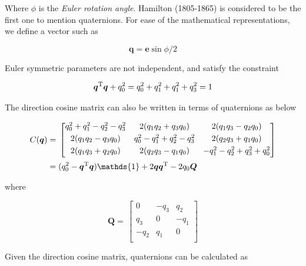 Where $\phi$ is the \emph{Euler rotation angle}. 
Hamilton (1805-1865) is considered to be the first one to mention quaternions. 
For ease of the mathematical representations, we define a vector such as

\begin{equation}
\label{eqn:quat3}
\bm{q} = \bm{e}\sin{\phi/2}
\end{equation}

Euler symmetric parameters are not independent, and satisfy the constraint

\begin{equation}
\label{eqn:quatNormConstraint}
\bm{q}^{\rm T} \bm{q} + q_0^2 = q_0^2 + q_1^2 +q_1^2 +q_3^2 = 1
\end{equation}

The direction cosine matrix can also be written in terms of quaternions as below

\begin{align}\label{eqn:Cquat}
\begin{split}
C(\bm{q})
 & =\,
\begin{bmatrix}
q_0^2 + q_1^2 - q_2^2 - q_3^2 & 2(q_1 q_2 + q_3 q_0) & 2(q_1 q_3 - q_2 q_0)\\[0.3em]
2(q_1 q_2 - q_3 q_0) & q_0^2 - q_1^2 + q_2^2 - q_3^2 & 2(q_2 q_3 + q_1 q_0)\\[0.3em]
2(q_1 q_3 + q_2 q_0) & 2(q_2 q_3 - q_1 q_0) & -q_1^2 - q_2^2 + q_3^2 + q_0^2\\[0.3em]
\end{bmatrix}
\\
& = (q_0^2 - \bm{q}^{\rm T}\bm{q} )\mathds{1} + 2\bm{q}\bm{q}^{\rm T} - 2q_0\bm{Q}
\end{split}
\end{align}
 
where

\begin{equation}
\label{eqn:Qmatrix}
\bm{Q}
=\,
\begin{bmatrix}
0 & - q_3 & q_2 \\[0.3em]
q_3 & 0 & - q_1 \\[0.3em]
- q_2 & q_1 & 0\\[0.3em]
\end{bmatrix}
\end{equation}

Given the direction cosine matrix, quaternions can be calculated as

